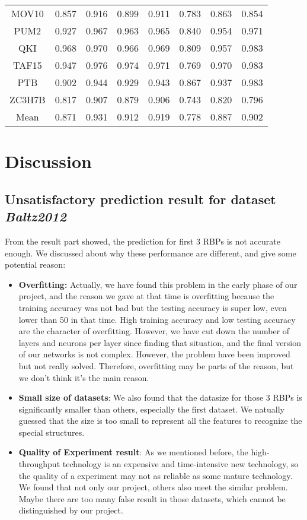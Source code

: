 \documentclass[twoside,twocolumn]{article}
\begin{document}
\begin{table*}
\begin{tabular}{c|ccccccc}
  MOV10    & 0.857 & 0.916 & 0.899 & 0.911 & 0.783 & 0.863 & 0.854 \\
  PUM2     & 0.927 & 0.967 & 0.963 & 0.965 & 0.840 & 0.954 & 0.971 \\
  QKI      & 0.968 & 0.970 & 0.966 & 0.969 & 0.809 & 0.957 & 0.983 \\
  TAF15    & 0.947 & 0.976 & 0.974 & 0.971 & 0.769 & 0.970 & 0.983 \\
  PTB      & 0.902 & 0.944 & 0.929 & 0.943 & 0.867 & 0.937 & 0.983 \\
  ZC3H7B   & 0.817 & 0.907 & 0.879 & 0.906 & 0.743 & 0.820 & 0.796 \\
  Mean     & 0.871 & 0.931 & 0.912 & 0.919 & 0.778 & 0.887 & 0.902 \\
  \bottomrule
  \end{tabular}
  \end{table*}
  


\section{Discussion}

\subsection{Unsatisfactory prediction result for dataset \em Baltz2012}

From the result part showed, the prediction for first 3 RBPs is not accurate enough. We discussed about why these performance are different, and give some potential reason:

\begin{itemize}
    \item \textbf{Overfitting:} Actually, we have found this problem in the early phase of our project, and the reason we gave at that time is overfitting because the training accuracy was not bad but the testing accuracy is super low, even lower than 50 in that time. High training accuracy and low testing accuracy are the character of overfitting. However, we have cut down the number of layers and neurons per layer since finding that situation, and the final version of our networks is not complex. However, the problem have been improved but not really solved. Therefore, overfitting may be parts of the reason, but we don't think it's the main reason.
    \item \textbf{Small size of datasets}: We also found that the datasize for those 3 RBPs is significantly smaller than others, especially the first dataset. We natually guessed that the size is too small to represent all the features to recognize the special structures.
    \item \textbf{Quality of Experiment result}: As we mentioned before, the high-throughput technology is an expensive and time-intensive new technology, so the quality of a experiment may not as reliable as some mature technology. We found that not only our project, others also meet the similar problem. Maybe there are too many false result in those datasets, which cannot be distinguished by our project.
\end{itemize}
\end{document}
